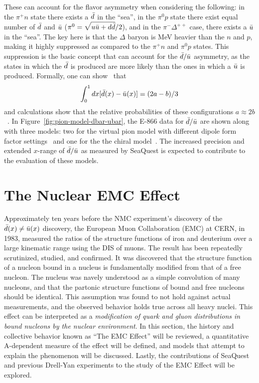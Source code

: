These can account for the flavor asymmetry when considering the following: in the $\pi^+ n$ state there exists a $\bar{d}$ in the ``sea'', in the $\pi^0 p$ state there exist equal number of $\bar{d}$ and $\bar{u}$ ($\pi^0=\sqrt{u\bar{u}+d\bar{d}}/2$), and in the $\pi^- \Delta^{++}$ case, there exists a $\bar{u}$ in the ``sea''. The key here is that the $\Delta$ baryon is \unit[294]{MeV} heavier than the $n$ and $p$, making it highly suppressed as compared to the $\pi^+ n$ and $\pi^0 p$ states. This suppression is the basic concept that can account for the $\bar{d}/\bar{u}$ asymmetry, as the states in which the $\bar{d}$ is produced are more likely than the ones in which a $\bar{u}$ is produced. Formally, one can show~\cite{Szczurek:1993sc} that
\begin{equation}
\int_0^1 dx [\bar{d}(x)-\bar{u}(x)] = (2a-b)/3
\end{equation}
and calculations show that the relative probabilities of these configurations $a \approx 2b$~\cite{Koepf:1995yh}. In Figure~\ref{fig:pion-model-dbar-ubar}, the E-866 data for $\bar{d}/\bar{u}$ are shown along with three models: two for the virtual pion model with different dipole form factor settings~\cite{Kumano:1990mm, Koepf:1995yh} and one for the the chiral model~\cite{Szczurek:1996tp}. The increased precision and extended $x$-range of $\bar{d}/\bar{u}$ as measured by SeaQuest is expected to contribute to the evaluation of these models.

\section{The Nuclear EMC Effect}

Approximately ten years before the NMC experiment's discovery of the $\bar{d}(x)\neq\bar{u}(x)$ discovery, the European Muon Collaboration (EMC) at CERN, in 1983, measured the ratios of the structure functions of iron and deuterium over a large kinematic range using the DIS of muons\cite{Aubert:1983xm}. The result has been repeatedly scrutinized, studied, and confirmed. It was discovered that the structure function of a nucleon bound in a nucleus is fundamentally modified from that of a free nucleon. The nucleus was navely understood as a simple convolution of many nucleons, and that the partonic structure functions of bound and free nucleons should be identical. This assumption was found to not hold against actual measurements, and the observed behavior holds true across all heavy nuclei. This effect can be interpreted as a \emph{modification of quark and gluon distributions in bound nucleons by the nuclear environment}. In this section, the history and collective behavior known as ``The EMC Effect'' will be reviewed, a quantitative A-dependent measure of the effect will be defined, and models that attempt to explain the phenomenon will be discussed. Lastly, the contributions of SeaQuest and previous Drell-Yan experiments to the study of the EMC Effect will be explored.


